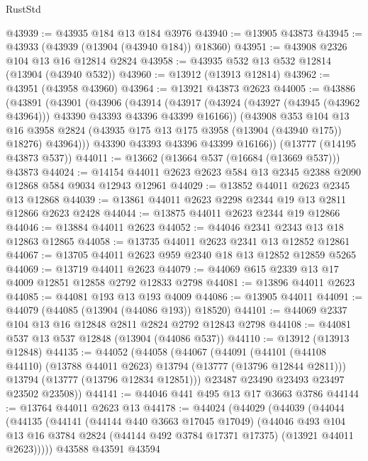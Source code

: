 \begin{lexlean}{RustStd}
\begin{coremodule}
@43939 := @43935 @184 @13 @184 @3976
@43940 := @13905 @43873
@43945 := @43933 (@43939 (@13904 (@43940 @184)) @18360)
@43951 := @43908 @2326 @104 @13 @16 @12814 @2824
@43958 := @43935 @532 @13 @532 @12814 (@13904 (@43940 @532))
@43960 := @13912 (@13913 @12814)
@43962 := @43951 (@43958 @43960)
@43964 := @13921 @43873 @2623
@44005 := @43886
    (@43891
      (@43901
        (@43906
          (@43914
            (@43917 (@43924 (@43927 (@43945 (@43962 @43964))) @43390 @43393 @43396 @43399 @16166))
            (@43908
              @353
              @104
              @13
              @16
              @3958
              @2824
              (@43935 @175 @13 @175 @3958 (@13904 (@43940 @175)) @18276)
              @43964)))
        @43390
        @43393
        @43396
        @43399
        @16166))
    (@13777 (@14195 @43873 @537))
@44011 := @13662 (@13664 @537 (@16684 (@13669 @537))) @43873
@44024 := @14154 @44011 @2623 @2623 @584 @13 @2345 @2388 @2090 @12868 @584 @9034 @12943 @12961
@44029 := @13852 @44011 @2623 @2345 @13 @12868
@44039 := @13861 @44011 @2623 @2298 @2344 @19 @13 @2811 @12866 @2623 @2428
@44044 := @13875 @44011 @2623 @2344 @19 @12866
@44046 := @13884 @44011 @2623
@44052 := @44046 @2341 @2343 @13 @18 @12863 @12865
@44058 := @13735 @44011 @2623 @2341 @13 @12852 @12861
@44067 := @13705 @44011 @2623 @959 @2340 @18 @13 @12852 @12859 @5265
@44069 := @13719 @44011 @2623
@44079 := @44069 @615 @2339 @13 @17 @4009 @12851 @12858 @2792 @12833 @2798
@44081 := @13896 @44011 @2623
@44085 := @44081 @193 @13 @193 @4009
@44086 := @13905 @44011
@44091 := @44079 (@44085 (@13904 (@44086 @193)) @18520)
@44101 := @44069 @2337 @104 @13 @16 @12848 @2811 @2824 @2792 @12843 @2798
@44108 := @44081 @537 @13 @537 @12848 (@13904 (@44086 @537))
@44110 := @13912 (@13913 @12848)
@44135 := @44052
    (@44058
      (@44067
        (@44091
          (@44101 (@44108 @44110) (@13788 @44011 @2623) @13794 (@13777 (@13796 @12844 @2811)))
          @13794
          (@13777 (@13796 @12834 @12851)))
        @23487
        @23490
        @23493
        @23497
        @23502
        @23508))
@44141 := @44046 @441 @495 @13 @17 @3663 @3786
@44144 := @13764 @44011 @2623 @13
@44178 := @44024
    (@44029
      (@44039
        (@44044
          (@44135
            (@44141
              (@44144 @440 @3663 @17045 @17049)
              (@44046
                @493
                @104
                @13
                @16
                @3784
                @2824
                (@44144 @492 @3784 @17371 @17375)
                (@13921 @44011 @2623)))))
        @43588
        @43591
        @43594

\end{coremodule}
\end{lexlean}
